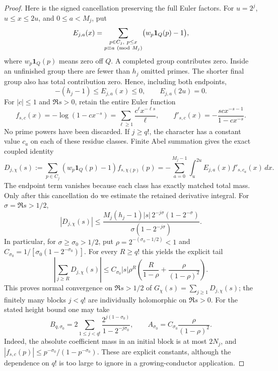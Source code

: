 \documentclass[11pt]{article}
\theoremstyle{definition}
\begin{document}
\begin{proof}
Here is the signed cancellation preserving the full Euler
factors. For $u=2^j$, $u\le x\le2u$, and $0\le a<M_j$, put
\[
 E_{j,a}(x)=
 \sum_{\substack{p\in C_j,\ p\le x\\p\equiv a\ ({\rm mod}\ M_j)}}
       \bigl(w_p\mathbf1_Q(p)-1\bigr),
\]
where $w_p\mathbf1_Q(p)$ means zero off $Q$.
A completed group contributes zero. Inside an unfinished
group there are fewer than $h_j$ omitted primes.
The shorter final group also has total contribution zero.
Hence, including both endpoints,
\[
 -(h_j-1)\le E_{j,a}(x)\le0,\qquad E_{j,a}(2u)=0.
\]
For $|c|\le1$ and $\Re s>0$, retain the entire Euler function
\[
 f_{s,c}(x)=-\log(1-cx^{-s})
   =\sum_{\ell\ge1}\frac{c^\ell x^{-\ell s}}{\ell},
 \qquad
 f'_{s,c}(x)=-\frac{scx^{-s-1}}{1-cx^{-s}}.
\]
No prime powers have been discarded.
If $j\ge q!$, the character has a constant value $c_a$ on
each of these residue classes. Finite Abel summation gives
the exact coupled identity
\[
 D_{j,\chi}(s):=
 \sum_{p\in C_j}(w_p\mathbf1_Q(p)-1)f_{s,\chi(p)}(p)
 =-\sum_{a=0}^{M_j-1}\int_u^{2u}E_{j,a}(x)f'_{s,c_a}(x)\,dx.
\]
The endpoint term vanishes because each class has exactly
matched total mass. Only after this cancellation do we
estimate the retained derivative integral. For
$\sigma=\Re s>1/2$,
\[
 |D_{j,\chi}(s)|
 \le
 \frac{M_j(h_j-1)|s|\,2^{-j\sigma}(1-2^{-\sigma})}
      {\sigma(1-2^{-j\sigma})}.
\]
In particular, for $\sigma\ge\sigma_0>1/2$, put
$\rho=2^{-(\sigma_0-1/2)}<1$ and
$C_{\sigma_0}=1/[\sigma_0(1-2^{-\sigma_0})]$.
For every $R\ge q!$ this yields the explicit tail
\[
 \left|\sum_{j\ge R}D_{j,\chi}(s)\right|
 \le C_{\sigma_0}|s|\rho^R
       \left(\frac{R}{1-\rho}
                      +\frac{\rho}{(1-\rho)^2}\right).
\]
This proves normal convergence on $\Re s>1/2$ of
$G_\chi(s)=\sum_{j\ge1}D_{j,\chi}(s)$; the finitely many
blocks $j<q!$ are individually holomorphic on $\Re s>0$.
For the stated height bound one may take
\[
 B_{q,\sigma_0}=
 2\sum_{1\le j<q!}
       \frac{2^{j(1-\sigma_0)}}{1-2^{-j\sigma_0}},
 \qquad
 A_{\sigma_0}=
 C_{\sigma_0}\frac{\rho}{(1-\rho)^2}.
\]
Indeed, the absolute coefficient mass in an initial block
is at most $2N_j$, and
$|f_{s,c}(p)|\le p^{-\sigma_0}/(1-p^{-\sigma_0})$.
These are explicit constants, although the dependence on
$q!$ is too large to ignore in a growing-conductor application.


\end{proof}
\end{document}
